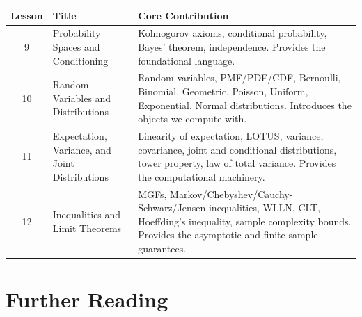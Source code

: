 \documentclass[11pt,a4paper]{article}
\begin{document}
\begin{center}
\begin{tabular}{@{}clp{7.5cm}@{}}
\toprule
\textbf{Lesson} & \textbf{Title} & \textbf{Core Contribution} \\
\midrule
9 & Probability Spaces and Conditioning
  & Kolmogorov axioms, conditional probability, Bayes' theorem,
    independence. Provides the foundational language. \\
10 & Random Variables and Distributions
  & Random variables, PMF/PDF/CDF, Bernoulli, Binomial, Geometric,
    Poisson, Uniform, Exponential, Normal distributions.
    Introduces the objects we compute with. \\
11 & Expectation, Variance, and Joint Distributions
  & Linearity of expectation, LOTUS, variance, covariance, joint
    and conditional distributions, tower property, law of total
    variance. Provides the computational machinery. \\
12 & Inequalities and Limit Theorems
  & MGFs, Markov/Chebyshev/Cauchy-Schwarz/Jensen inequalities,
    WLLN, CLT, Hoeffding's inequality, sample complexity bounds.
    Provides the asymptotic and finite-sample guarantees. \\
\bottomrule
\end{tabular}
\end{center}


\section{Further Reading}
\label{sec:further_reading}
\end{document}
